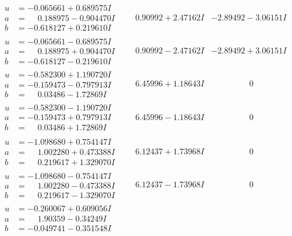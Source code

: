 \documentclass[1p]{elsarticle_modified}
\theoremstyle{definition}
\begin{document}
$$\begin{array}{c|c|c}
\begin{aligned}
u &= -0.065661 + 0.689575 I \\
a &= \phantom{-}0.188975 - 0.904470 I \\
b &= -0.618127 + 0.219610 I\end{aligned}
 & \phantom{-}0.90992 + 2.47162 I & -2.89492 - 3.06151 I \\ \hline\begin{aligned}
u &= -0.065661 - 0.689575 I \\
a &= \phantom{-}0.188975 + 0.904470 I \\
b &= -0.618127 - 0.219610 I\end{aligned}
 & \phantom{-}0.90992 - 2.47162 I & -2.89492 + 3.06151 I \\ \hline\begin{aligned}
u &= -0.582300 + 1.190720 I \\
a &= -0.159473 - 0.797913 I \\
b &= \phantom{-}0.03486 - 1.72869 I\end{aligned}
 & \phantom{-}6.45996 + 1.18643 I & \phantom{-0.000000 } 0 \\ \hline\begin{aligned}
u &= -0.582300 - 1.190720 I \\
a &= -0.159473 + 0.797913 I \\
b &= \phantom{-}0.03486 + 1.72869 I\end{aligned}
 & \phantom{-}6.45996 - 1.18643 I & \phantom{-0.000000 } 0 \\ \hline\begin{aligned}
u &= -1.098680 + 0.754147 I \\
a &= \phantom{-}1.002280 + 0.473388 I \\
b &= \phantom{-}0.219617 + 1.329070 I\end{aligned}
 & \phantom{-}6.12437 + 1.73968 I & \phantom{-0.000000 } 0 \\ \hline\begin{aligned}
u &= -1.098680 - 0.754147 I \\
a &= \phantom{-}1.002280 - 0.473388 I \\
b &= \phantom{-}0.219617 - 1.329070 I\end{aligned}
 & \phantom{-}6.12437 - 1.73968 I & \phantom{-0.000000 } 0 \\ \hline\begin{aligned}
u &= -0.260067 + 0.609056 I \\
a &= \phantom{-}1.90359 - 0.34249 I \\
b &= -0.049741 - 0.351548 I\end{aligned}

\end{array}$$
\end{document}
